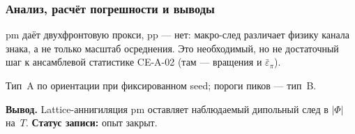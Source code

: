 \subsubsection*{Анализ, расчёт погрешности и выводы}
pm даёт двухфронтовую прокси, pp --- нет: макро-след различает физику канала знака, а не только масштаб осреднения.
Это необходимый, но не достаточный шаг к ансамблевой статистике CE-A-02 (там --- вращения и $\bar\varepsilon_\pi$).

Тип~A по ориентации при фиксированном seed; пороги пиков --- тип~B.

\textbf{Вывод.}
Lattice-аннигиляция pm оставляет наблюдаемый дипольный след в $|\Phi|$ на~$T$.
\textbf{Статус записи:} опыт закрыт.
